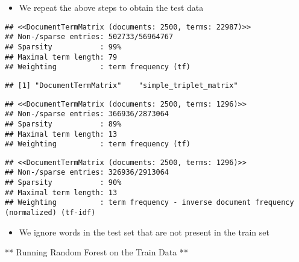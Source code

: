 \documentclass[
  12pt,
]{article}
\providecommand{\tightlist}{%
  \setlength{\itemsep}{0pt}\setlength{\parskip}{0pt}}
\begin{document}
\begin{itemize}
\tightlist
\item
  We repeat the above steps to obtain the test data
\end{itemize}

\begin{verbatim}
## <<DocumentTermMatrix (documents: 2500, terms: 22987)>>
## Non-/sparse entries: 502733/56964767
## Sparsity           : 99%
## Maximal term length: 79
## Weighting          : term frequency (tf)
\end{verbatim}

\begin{verbatim}
## [1] "DocumentTermMatrix"    "simple_triplet_matrix"
\end{verbatim}

\begin{verbatim}
## <<DocumentTermMatrix (documents: 2500, terms: 1296)>>
## Non-/sparse entries: 366936/2873064
## Sparsity           : 89%
## Maximal term length: 13
## Weighting          : term frequency (tf)
\end{verbatim}

\begin{verbatim}
## <<DocumentTermMatrix (documents: 2500, terms: 1296)>>
## Non-/sparse entries: 326936/2913064
## Sparsity           : 90%
## Maximal term length: 13
## Weighting          : term frequency - inverse document frequency (normalized) (tf-idf)
\end{verbatim}

\begin{itemize}
\tightlist
\item
  We ignore words in the test set that are not present in the train set
\end{itemize}

** Running Random Forest on the Train Data **
\end{document}

